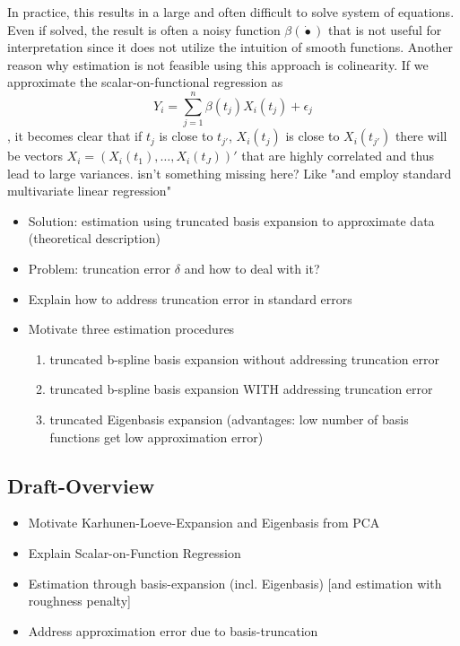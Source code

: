 \documentclass[11pt,twoside,a4paper]{article}
\begin{document}
   In practice, this results in a large and often difficult to solve system of equations. Even if solved, the result is often a noisy function $\beta(\dot{•})$ that is not useful for interpretation since it does not utilize the intuition of smooth functions. Another reason why estimation is not feasible using this approach is colinearity.
   If we approximate the scalar-on-functional regression as
  	\begin{equation}
     Y_i = \sum_{j = 1}^{n} \beta(t_{j})X_i(t_{j}) + \epsilon_{j}
    \end{equation}, it becomes clear that if $t_{j}$ is close to $t_{j'}$, $X_{i}(t_{j})$ is close to $X_{i}(t_{j'})$ there will be vectors $X_{i} = (X_i(t_1), \dots, X_i(t_J))'$ that are highly correlated and thus lead to large variances. {\color{red} isn't something missing here? Like "and employ standard multivariate linear regression"}
   
    
	
	\begin{itemize}
		\item Solution: estimation using truncated basis expansion to approximate data (theoretical description)
		\item Problem: truncation error $\delta$ and how to deal with it?
		\item Explain how to address truncation error in standard errors
		\item Motivate three estimation procedures
		\begin{enumerate}
			\item truncated b-spline basis expansion without addressing truncation error
			\item truncated b-spline basis expansion WITH addressing truncation error
			\item truncated Eigenbasis expansion (advantages: low number of basis functions get low approximation error)
		\end{enumerate}
	\end{itemize}
	
	\subsection{Draft-Overview}
	\begin{itemize}
		\item Motivate Karhunen-Loeve-Expansion and Eigenbasis from PCA		
		\item Explain Scalar-on-Function Regression
		\item Estimation through basis-expansion (incl. Eigenbasis) [and estimation with roughness penalty]
		\item Address approximation error due to basis-truncation
	\end{itemize}
\end{document}
